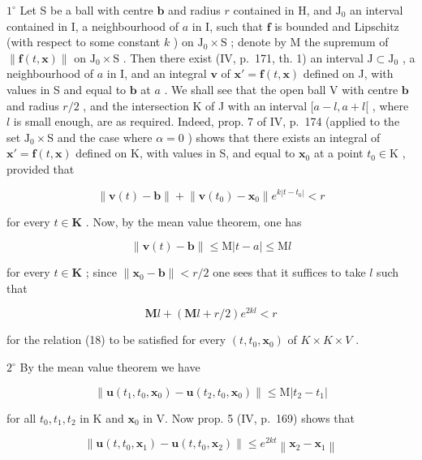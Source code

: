 \(1^{\circ}\) Let S be a ball with centre \(\mathbf{b}\) and radius \(r\) contained in H, and \(\mathrm{J}_0\) an interval contained in I, a neighbourhood of \(a\) in I, such that \(\mathbf{f}\) is bounded and Lipschitz (with respect to some constant \(k\) ) on \(\mathrm{J}_0 \times \mathrm{S}\) ; denote by M the supremum of \(\| \mathbf{f}(t, \mathbf{x})\|\) on \(\mathrm{J}_0 \times \mathrm{S}\) . Then there exist (IV, p.~171, th. 1) an interval \(\mathrm{J} \subset \mathrm{J}_0\) , a neighbourhood of \(a\) in I, and an integral \(\mathbf{v}\) of \(\mathbf{x}' = \mathbf{f}(t, \mathbf{x})\) defined on J, with values in S and equal to \(\mathbf{b}\) at \(a\) . We shall see that the open ball V with centre \(\mathbf{b}\) and radius \(r/2\) , and the intersection K of J with an interval \([a - l, a + l[\) , where \(l\) is small enough, are as required. Indeed, prop. 7 of IV, p.~174 (applied to the set \(\mathrm{J}_0 \times \mathrm{S}\) and the case where \(\alpha = 0\) ) shows that there exists an integral of \(\mathbf{x}' = \mathbf{f}(t, \mathbf{x})\) defined on K, with values in S, and equal to \(\mathbf{x}_0\) at a point \(t_0 \in \mathrm{K}\) , provided that

\[
\left\| \mathbf {v} (t) - \mathbf {b} \right\| + \left\| \mathbf {v} (t _ {0}) - \mathbf {x} _ {0} \right\| e ^ {k | t - t _ {0} |} <   r\tag{18}
\]

for every \(t \in \mathbf{K}\) . Now, by the mean value theorem, one has

\[
\| \mathbf {v} (t) - \mathbf {b} \| \leqslant \mathrm{M} | t - a | \leqslant \mathrm{M} l
\]

for every \(t \in \mathbf{K}\) ; since \(\| \mathbf{x}_0 - \mathbf{b} \| < r / 2\) one sees that it suffices to take \(l\) such that

\[
\mathbf {M} l + (\mathbf {M} l + r / 2) e ^ {2 k l} <   r\tag{19}
\]

for the relation (18) to be satisfied for every \((t, t_{0}, \mathbf{x}_{0})\) of \(K \times K \times V\) .

\(2^{\circ}\) By the mean value theorem we have

\[
\left\| \mathbf {u} (t _ {1}, t _ {0}, \mathbf {x} _ {0}) - \mathbf {u} (t _ {2}, t _ {0}, \mathbf {x} _ {0}) \right\| \leqslant \mathrm{M} \left| t _ {2} - t _ {1} \right|\tag{20}
\]

for all \(t_0, t_1, t_2\) in K and \(\mathbf{x}_0\) in V. Now prop. 5 (IV, p.~169) shows that

\[
\left\| \mathbf {u} (t, t _ {0}, \mathbf {x} _ {1}) - \mathbf {u} (t, t _ {0}, \mathbf {x} _ {2}) \right\| \leqslant e ^ {2 k t} \left\| \mathbf {x} _ {2} - \mathbf {x} _ {1} \right\|\tag{21}
\]

